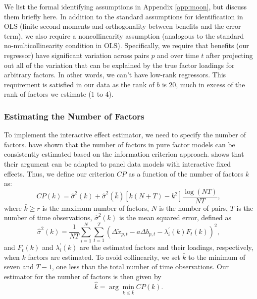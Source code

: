 \documentclass[12pt]{article}
\newcommand{\1}{\mathbf{1}}
\begin{document}
We list the formal identifying assumptions in Appendix \ref{app:moon}, but discuss them briefly here. In addition to the standard assumptions for identification in OLS (finite second moments and orthogonality between benefits and the error term), we also require a noncollinearity assumption (analogous to the standard no-multicollinearity condition in OLS). Specifically, we require that benefits (our regressor) have significant variation across pairs $p$ and over time $t$ after projecting out all of the variation that can be explained by the true factor loadings for arbitrary factors. In other words, we can't have low-rank regressors. This requirement is satisfied in our data as the rank of $b$ is 20, much in excess of the rank of factors we estimate (1 to 4). %


\subsubsection{Estimating the Number of Factors}
To implement the interactive effect estimator, we need to specify the number of factors. \citet{bai+ng:02} have shown that the number of factors in pure factor models can be consistently estimated based on the information criterion approach. \citet{bai:09} shows that their argument can be adapted to panel data models with interactive fixed effects. Thus, we define our criterion $CP$ as a function of the number of factors $k$ as:
\[
CP(k)=\hat{\sigma}^{2}(k)+\hat{\sigma}^{2}(\bar{k})\left[k\left(N+T\right)-k^{2}\right]\frac{\log\left(NT\right)}{NT},
\]
where $\bar{k}\geq r$ is the maximum number of factors, $N$ is the number of pairs, $T$ is the number of time observations, $\hat{\sigma}^{2}(k)$ is the mean squared error, defined as
\[
\hat{\sigma}^{2}(k)=\frac{1}{NT}\sum_{i=1}^{N}\sum_{t=1}^{T}\left(\Delta\tilde{x}_{p,t}-a\Delta b_{p,t}-\lambda_{i}^{'}\left(k\right)F_{t}\left(k\right)\right)^{2},
\]
and $F_{t}\left(k\right)$ and $\lambda_{i}^{'}\left(k\right)$ are the estimated factors and their loadings, respectively, when $k$ factors are estimated. To avoid collinearity, we set $\bar{k}$ to the minimum of seven and $T-1$, one less than the total number of time observations. Our estimator for the number of factors is then given by
\[
\hat{k}=\arg\min_{k\leq\bar{k}}CP(k).
\]
\end{document}
